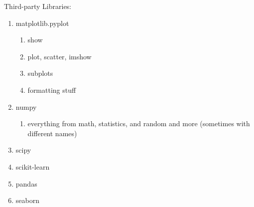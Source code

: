 \documentclass{article}
\begin{document}
Third-party Libraries:
\begin{enumerate}
	\item matplotlib.pyplot
	\begin{enumerate}
		\item show
		\item plot, scatter, imshow
		\item subplots
		\item formatting stuff
	\end{enumerate}
	\item numpy
	\begin{enumerate}
		\item everything from math, statistics, and random and more (sometimes with different names)
	\end{enumerate}
	\item scipy
	\item scikit-learn
	\item pandas
	\item seaborn
\end{enumerate}
\end{document}

